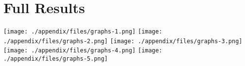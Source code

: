 \section{Full Results}
\texttt{[image: ./appendix/files/graphs-1.png]}
\texttt{[image: ./appendix/files/graphs-2.png]}
\texttt{[image: ./appendix/files/graphs-3.png]}
\texttt{[image: ./appendix/files/graphs-4.png]}
\texttt{[image: ./appendix/files/graphs-5.png]}